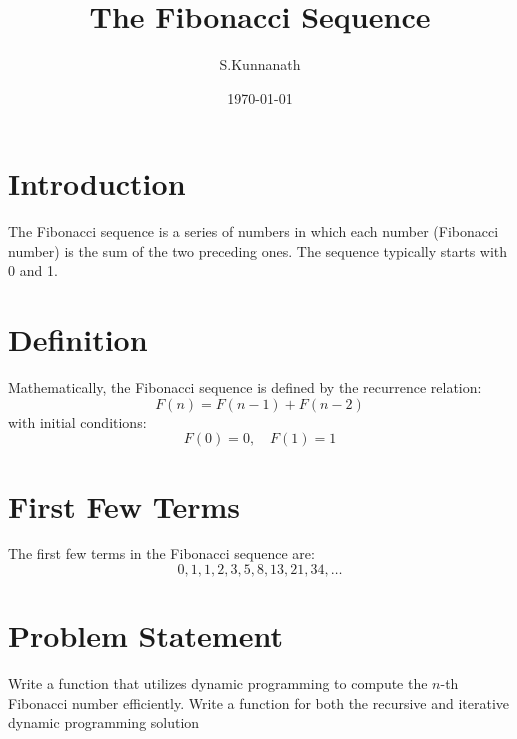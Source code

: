 \documentclass{article}
\title{The Fibonacci Sequence}
\author{S.Kunnanath}
\date{\today}
\begin{document}
\maketitle

\section{Introduction}
The Fibonacci sequence is a series of numbers in which each number (Fibonacci number) is the sum of the two preceding ones. The sequence typically starts with 0 and 1. 

\section{Definition}
Mathematically, the Fibonacci sequence is defined by the recurrence relation:
\[
F(n) = F(n-1) + F(n-2)
\]
with initial conditions:
\[
F(0) = 0, \quad F(1) = 1
\]

\section{First Few Terms}
The first few terms in the Fibonacci sequence are:
\[
0, 1, 1, 2, 3, 5, 8, 13, 21, 34, \ldots
\]

\section{Problem Statement}
Write a function that utilizes dynamic programming to compute the \(n\)-th Fibonacci number efficiently. 
Write a function for both the recursive and iterative dynamic programming solution 
\end{document}
